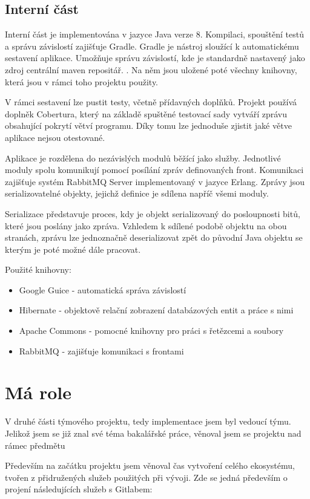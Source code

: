 \documentclass[thesis=B,czech]{FITthesis}[2012/06/26]
\begin{document}
\subsection{Interní část}
Interní část je implementována v jazyce Java verze 8. Kompilaci, spouštění testů a správu závislostí zajišťuje Gradle\cite{gradle}.
Gradle je nástroj sloužící k automatickému sestavení aplikace. Umožňuje správu závislostí, kde je standardně nastavený jako zdroj
centrální maven repositář. \cite{mavenRepo}. Na něm jsou uložené poté všechny knihovny, která jsou v rámci toho projektu použity.
\par
V rámci sestavení lze pustit testy, včetně přídavných doplňků. Projekt používá
doplněk Cobertura\cite{cobertura}, který na základě spuštěné testovací sady vytváří zprávu obsahující pokrytí větví programu.
Díky tomu lze jednoduše zjistit jaké větve aplikace nejsou otestované.
\par
Aplikace je rozdělena do nezávislých modulů běžící jako služby. Jednotlivé moduly spolu komunikují
pomocí posílání zpráv definovaných front. Komunikaci zajišťuje systém RabbitMQ Server implementovaný v jazyce Erlang. Zprávy jsou serializovatelné objekty, jejichž definice je sdílena napříč všemi moduly.
\par
Serializace představuje proces, kdy je objekt serializovaný do posloupnosti bitů, které jsou poslány jako zpráva. 
Vzhledem k sdílené podobě objektu na obou stranách, zprávu lze jednoznačně deserializovat zpět do původní Java objektu se kterým
je poté možné dále pracovat.\cite{serialization}

\par
Použité knihovny:
\begin{itemize}
\item Google Guice - automatická správa závislostí \cite{guice}
\item Hibernate - objektově relační zobrazení databázových entit a práce s nimi \cite{hibernate}
\item Apache Commons - pomocné knihovny pro práci s řetězcemi a soubory \cite{commons}
\item RabbitMQ - zajišťuje komunikaci s frontami \cite{rabbitMQ}
\end{itemize}

\section{Má role}
V druhé části týmového projektu, tedy implementace jsem byl vedoucí týmu. Jelikož jsem se již znal své téma bakalářské práce, 
věnoval jsem se projektu nad rámec předmětu
\par
Především na začátku projektu jsem věnoval čas vytvoření celého ekosystému, tvořen z přidružených služeb použitých při vývoji.
Zde se jedná především o projení následujících služeb s Gitlabem:
\end{document}
